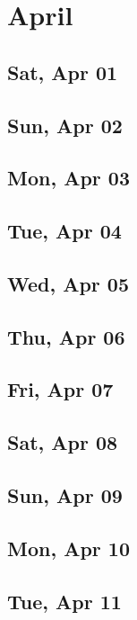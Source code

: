 \chapter{April}
	\section{Sat, Apr 01}
		
	\section{Sun, Apr 02}
		
	\section{Mon, Apr 03}
		
	\section{Tue, Apr 04}
		
	\section{Wed, Apr 05}
		
	\section{Thu, Apr 06}
		
	\section{Fri, Apr 07}
		
	\section{Sat, Apr 08}
		
	\section{Sun, Apr 09}
		
	\section{Mon, Apr 10}
		
	\section{Tue, Apr 11}
		
